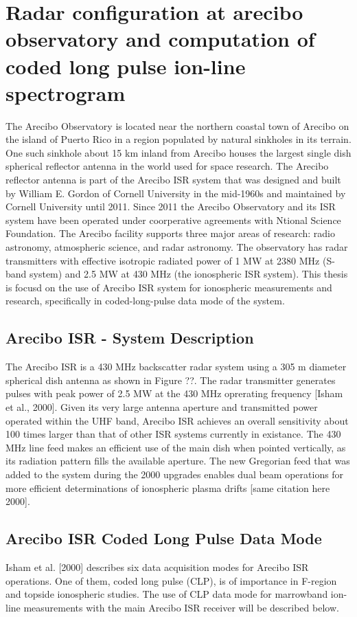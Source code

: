 \chapter{Radar configuration at arecibo observatory and computation of coded long pulse ion-line spectrogram}
The Arecibo Observatory is located near the northern coastal town of Arecibo on the island of Puerto Rico in a region populated by natural sinkholes in its terrain. One such sinkhole about 15 km inland from Arecibo houses the largest single dish spherical reflector antenna in the world used for space research. The Arecibo reflector antenna is part of the Arecibo ISR system that was designed and built by William E. Gordon of Cornell University in the mid-1960s and maintained by Cornell University until 2011. Since 2011 the Arecibo Observatory and its ISR system have been operated under coorperative agreements with Ntional Science Foundation. The Arecibo facility supports three major areas of research: radio astronomy, atmospheric science, and radar astronomy. The observatory has radar transmitters with effective isotropic radiated power of 1 MW at 2380 MHz (S-band system) and 2.5 MW at 430 MHz (the ionospheric ISR system). This thesis is focusd on the use of Arecibo ISR system for ionospheric measurements and research, specifically in coded-long-pulse data mode of the system.

\section{Arecibo ISR - System Description} The Arecibo ISR is a 430 MHz backscatter radar system using a 305 m diameter spherical dish antenna as shown in Figure ??. The radar transmitter generates pulses with peak power of 2.5 MW at the 430 MHz oprerating frequency [Isham et al., 2000]. Given its very large antenna aperture and transmitted power operated within the UHF band, Arecibo ISR achieves an overall sensitivity about 100 times larger than that of other ISR systems currently in existance. The 430 MHz line feed makes an efficient use of the main dish when pointed vertically, as its radiation pattern fills the available aperture. The new Gregorian feed that was added to the system during the 2000 upgrades enables dual beam operations for more efficient determinations of ionospheric plasma drifts [same citation here 2000].

\section{Arecibo ISR Coded Long Pulse Data Mode}
Isham et al. [2000] describes six data acquisition modes for Arecibo ISR operations. One of them, coded long pulse (CLP), is of importance in F-region and topside ionospheric studies. The use of CLP data mode for marrowband ion-line measurements with the main Arecibo ISR receiver will be described below.

